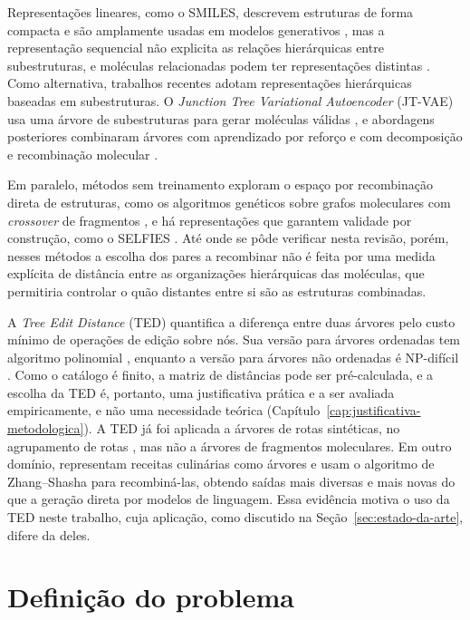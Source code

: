 Representações lineares, como o SMILES, descrevem estruturas de forma compacta e são amplamente usadas em modelos generativos \cite{weininger_1988,gomez_bombarelli_2018}, mas a representação sequencial não explicita as relações hierárquicas entre subestruturas, e moléculas relacionadas podem ter representações distintas \cite{jin_2018}. Como alternativa, trabalhos recentes adotam representações hierárquicas baseadas em subestruturas. O \textit{Junction Tree Variational Autoencoder} (JT-VAE) usa uma árvore de subestruturas para gerar moléculas válidas \cite{jin_2018}, e abordagens posteriores combinaram árvores com aprendizado por reforço e com decomposição e recombinação molecular \cite{ishitani_2022,yamada_2023}.

Em paralelo, métodos sem treinamento exploram o espaço por recombinação direta de estruturas, como os algoritmos genéticos sobre grafos moleculares com \textit{crossover} de fragmentos \cite{jensen_2019}, e há representações que garantem validade por construção, como o SELFIES \cite{krenn_2020}. Até onde se pôde verificar nesta revisão, porém, nesses métodos a escolha dos pares a recombinar não é feita por uma medida explícita de distância entre as organizações hierárquicas das moléculas, que permitiria controlar o quão distantes entre si são as estruturas combinadas.

A \textit{Tree Edit Distance} (TED) quantifica a diferença entre duas árvores pelo custo mínimo de operações de edição sobre nós. Sua versão para árvores ordenadas tem algoritmo polinomial \cite{zhang_shasha_1989,bille_2005}, enquanto a versão para árvores não ordenadas é NP-difícil \cite{zhang_statman_shasha_1992}. Como o catálogo é finito, a matriz de distâncias pode ser pré-calculada, e a escolha da TED é, portanto, uma justificativa prática e a ser avaliada empiricamente, e não uma necessidade teórica (Capítulo~\ref{cap:justificativa-metodologica}). A TED já foi aplicada a árvores de rotas sintéticas, no agrupamento de rotas \cite{genheden_2021}, mas não a árvores de fragmentos moleculares. Em outro domínio,  representam receitas culinárias como árvores e usam o algoritmo de Zhang--Shasha para recombiná-las, obtendo saídas mais diversas e mais novas do que a geração direta por modelos de linguagem. Essa evidência motiva o uso da TED neste trabalho, cuja aplicação, como discutido na Seção~\ref{sec:estado-da-arte}, difere da deles.

\section{Definição do problema}
\label{sec:problema}

